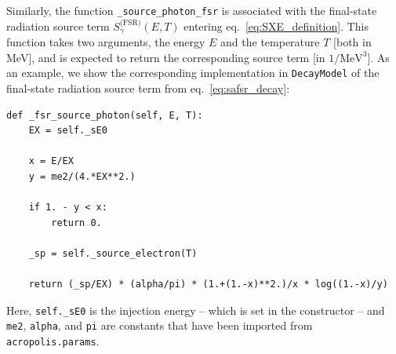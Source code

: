 \documentclass[11pt,a4paper]{article}
\begin{document}
Similarly, the function \texttt{\_source\_photon\_fsr} is associated with the final-state radiation source term $S_\gamma^\text{(FSR)}(E, T)$ entering eq.~\eqref{eq:SXE_definition}. This function takes two arguments, the energy $E$ and the temperature $T$ [both in MeV], and is expected to return the corresponding source term [in $1/\mathrm{MeV}^3$]. As an example, we show the corresponding implementation in \texttt{DecayModel} of the final-state radiation source term from eq.~\eqref{eq:safsr_decay}:
\begin{lstlisting}
def _fsr_source_photon(self, E, T):
	EX = self._sE0

	x = E/EX
	y = me2/(4.*EX**2.)

	if 1. - y < x:
		return 0.

	_sp = self._source_electron(T)

	return (_sp/EX) * (alpha/pi) * (1.+(1.-x)**2.)/x * log((1.-x)/y)
\end{lstlisting}
Here, \texttt{self.\_sE0} is the injection energy -- which is set in the constructor -- and \texttt{me2}, \texttt{alpha}, and \texttt{pi} are constants that have been imported from \texttt{acropolis.params}.
\end{document}
